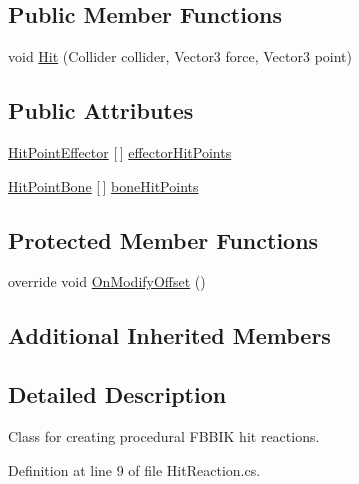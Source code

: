 \subsection*{Public Member Functions}
\begin{DoxyCompactItemize}
\item 
void \mbox{\hyperlink{class_root_motion_1_1_final_i_k_1_1_hit_reaction_abc91b95d86be35379bda9f8370fec7e5}{Hit}} (Collider collider, Vector3 force, Vector3 point)
\end{DoxyCompactItemize}
\subsection*{Public Attributes}
\begin{DoxyCompactItemize}
\item 
\mbox{\hyperlink{class_root_motion_1_1_final_i_k_1_1_hit_reaction_1_1_hit_point_effector}{Hit\+Point\+Effector}} \mbox{[}$\,$\mbox{]} \mbox{\hyperlink{class_root_motion_1_1_final_i_k_1_1_hit_reaction_a0ab31dcf8855274470247dcbefa3eb61}{effector\+Hit\+Points}}
\item 
\mbox{\hyperlink{class_root_motion_1_1_final_i_k_1_1_hit_reaction_1_1_hit_point_bone}{Hit\+Point\+Bone}} \mbox{[}$\,$\mbox{]} \mbox{\hyperlink{class_root_motion_1_1_final_i_k_1_1_hit_reaction_a9d7401d21f72ad8b4ae46a944288b94b}{bone\+Hit\+Points}}
\end{DoxyCompactItemize}
\subsection*{Protected Member Functions}
\begin{DoxyCompactItemize}
\item 
override void \mbox{\hyperlink{class_root_motion_1_1_final_i_k_1_1_hit_reaction_a46076fa7f2140df3df13553cb32b27d8}{On\+Modify\+Offset}} ()
\end{DoxyCompactItemize}
\subsection*{Additional Inherited Members}


\subsection{Detailed Description}
Class for creating procedural F\+B\+B\+IK hit reactions. 



Definition at line 9 of file Hit\+Reaction.\+cs.




